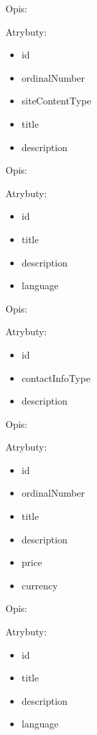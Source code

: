 \begin{enumerate}[label={\textbf{KAT/\protect\threedigits{\theenumi}}}, wide, labelwidth=!, labelindent=0pt, series=reqs]
     \label{kat:SiteContent}

    Opis: \lipsum[1]
    \par
    Atrybuty:
    \begin{itemize}
        \item id
        \item ordinalNumber
        \item siteContentType
        \item title
        \item description
    \end{itemize}

     \label{kat:SiteContentTranslation}

    Opis: \lipsum[1]
    \par
    Atrybuty:
    \begin{itemize}
        \item id
        \item title
        \item description
        \item language
    \end{itemize}

     \label{kat:ContactInfo}

    Opis: \lipsum[1]
    \par
    Atrybuty:
    \begin{itemize}
        \item id
        \item contactInfoType
        \item description
    \end{itemize}

     \label{kat:Pricing}

    Opis: \lipsum[1]
    \par
    Atrybuty:
    \begin{itemize}
        \item id
        \item ordinalNumber
        \item title
        \item description
        \item price
        \item currency
    \end{itemize}

     \label{kat:PricingTranslation}

    Opis: \lipsum[1]
    \par
    Atrybuty:
    \begin{itemize}
        \item id
        \item title
        \item description
        \item language
    \end{itemize}


\end{enumerate}
